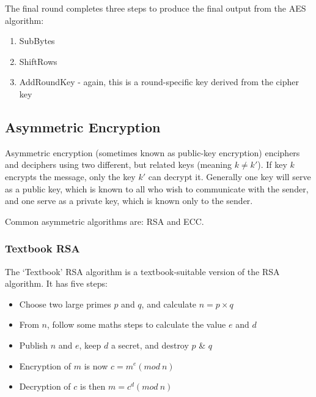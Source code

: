 The final round completes three steps to produce the final output from the AES algorithm:
\begin{enumerate}
    \item SubBytes
    \item ShiftRows
    \item AddRoundKey - again, this is a round-specific key derived from the cipher key
\end{enumerate}

\subsection{Asymmetric Encryption}
Asymmetric encryption (sometimes known as public-key encryption) enciphers and deciphers using two different, but related keys (meaning $k \neq k'$). If key $k$ encrypts the message, only the key $k'$ can decrypt it. Generally one key will serve as a public key, which is known to all who wish to communicate with the sender, and one serve as a private key, which is known only to the sender. 

Common asymmetric algorithms are: RSA and ECC. 

\subsubsection{Textbook RSA}
The `Textbook' RSA algorithm is a textbook-suitable version of the RSA algorithm. It has five steps:
\begin{itemize}
    \item Choose two large primes $p$ and $q$, and calculate $n=p\times q$
    \item From $n$, follow some maths steps to calculate the value $e$ and $d$
    \item Publish $n$ and $e$, keep $d$ a secret, and destroy $p$ \& $q$
    \item Encryption of $m$ is now $c=m^e (mod\ n)$
    \item Decryption of $c$ is then $m = c^d (mod\ n)$
\end{itemize}

